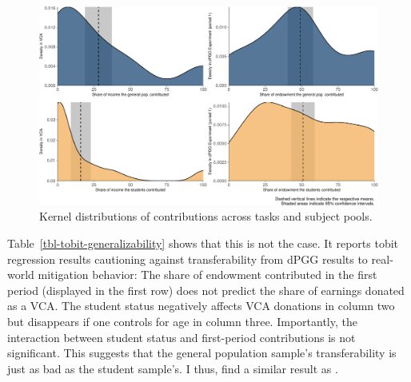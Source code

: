 \documentclass[
  authoryear,
  review,
  3p,
  onecolumn]{elsarticle}
\begin{document}
\begin{figure}

{\centering \includegraphics{paper_files/figure-pdf/fig-kernel-generalizability-1.pdf}

}

\caption{\label{fig-kernel-generalizability}Kernel distributions of
contributions across tasks and subject pools.}

\end{figure}

Table~\ref{tbl-tobit-generalizability} shows that this is not the case.
It reports tobit regression results cautioning against transferability
from dPGG results to real-world mitigation behavior: The share of
endowment contributed in the first period (displayed in the first row)
does not predict the share of earnings donated as a VCA. The student
status negatively affects VCA donations in column two but disappears if
one controls for age in column three. Importantly, the interaction
between student status and first-period contributions is not
significant. This suggests that the general population sample's
transferability is just as bad as the student sample's. I thus, find a
similar result as \citet[p.6]{GKLS2020}.
\end{document}
